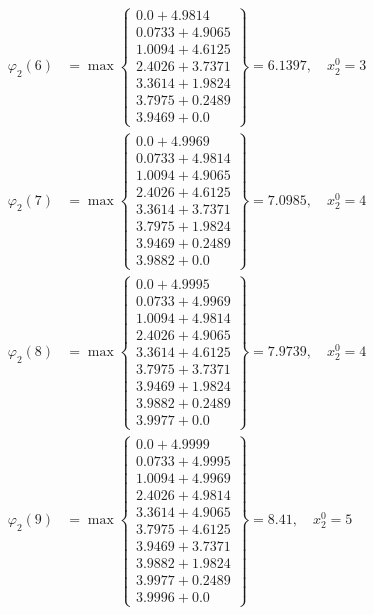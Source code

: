 \documentclass{article}
\begin{document}
\begin{align*}
\varphi_{2}(6) &= \max \left\{ \begin{array}{c}
0.0 + 4.9814 \\
 0.0733 + 4.9065 \\
 1.0094 + 4.6125 \\
 2.4026 + 3.7371 \\
 3.3614 + 1.9824 \\
 3.7975 + 0.2489 \\
 3.9469 + 0.0
\end{array} \right\}=6.1397, \quad x_{2}^0=3\\
  
\varphi_{2}(7) &= \max \left\{ \begin{array}{c}
0.0 + 4.9969 \\
 0.0733 + 4.9814 \\
 1.0094 + 4.9065 \\
 2.4026 + 4.6125 \\
 3.3614 + 3.7371 \\
 3.7975 + 1.9824 \\
 3.9469 + 0.2489 \\
 3.9882 + 0.0
\end{array} \right\}=7.0985, \quad x_{2}^0=4\\
  
\varphi_{2}(8) &= \max \left\{ \begin{array}{c}
0.0 + 4.9995 \\
 0.0733 + 4.9969 \\
 1.0094 + 4.9814 \\
 2.4026 + 4.9065 \\
 3.3614 + 4.6125 \\
 3.7975 + 3.7371 \\
 3.9469 + 1.9824 \\
 3.9882 + 0.2489 \\
 3.9977 + 0.0
\end{array} \right\}=7.9739, \quad x_{2}^0=4\\
  
\varphi_{2}(9) &= \max \left\{ \begin{array}{c}
0.0 + 4.9999 \\
 0.0733 + 4.9995 \\
 1.0094 + 4.9969 \\
 2.4026 + 4.9814 \\
 3.3614 + 4.9065 \\
 3.7975 + 4.6125 \\
 3.9469 + 3.7371 \\
 3.9882 + 1.9824 \\
 3.9977 + 0.2489 \\
 3.9996 + 0.0
\end{array} \right\}=8.41, \quad x_{2}^0=5\\
  

\end{align*}
\end{document}
